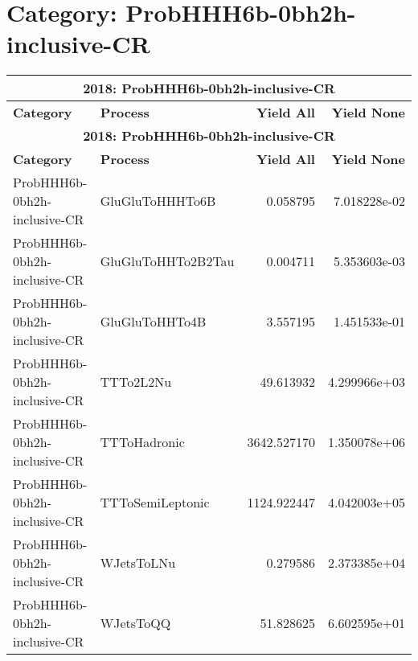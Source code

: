 \documentclass{article}
\begin{document}
\section*{Category: ProbHHH6b-0bh2h-inclusive-CR}
\begin{longtable}[c]{|l|l|r|r|}
\hline
\multicolumn{4}{|c|}{\textbf{2018: ProbHHH6b-0bh2h-inclusive-CR}} \\
\hline
\textbf{Category} & \textbf{Process} & \textbf{Yield All} & \textbf{Yield None} \\
\hline
\endfirsthead
\hline
\multicolumn{4}{|c|}{\textbf{2018: ProbHHH6b-0bh2h-inclusive-CR}} \\
\hline
\textbf{Category} & \textbf{Process} & \textbf{Yield All} & \textbf{Yield None} \\
\hline
\endhead
ProbHHH6b-0bh2h-inclusive-CR & GluGluToHHHTo6B & 0.058795 & 7.018228e-02 \\
\hline
ProbHHH6b-0bh2h-inclusive-CR & GluGluToHHTo2B2Tau & 0.004711 & 5.353603e-03 \\
\hline
ProbHHH6b-0bh2h-inclusive-CR & GluGluToHHTo4B & 3.557195 & 1.451533e-01 \\
\hline
ProbHHH6b-0bh2h-inclusive-CR & TTTo2L2Nu & 49.613932 & 4.299966e+03 \\
\hline
ProbHHH6b-0bh2h-inclusive-CR & TTToHadronic & 3642.527170 & 1.350078e+06 \\
\hline
ProbHHH6b-0bh2h-inclusive-CR & TTToSemiLeptonic & 1124.922447 & 4.042003e+05 \\
\hline
ProbHHH6b-0bh2h-inclusive-CR & WJetsToLNu & 0.279586 & 2.373385e+04 \\
\hline
ProbHHH6b-0bh2h-inclusive-CR & WJetsToQQ & 51.828625 & 6.602595e+01 \\
\hline
\end{longtable}
\end{document}
